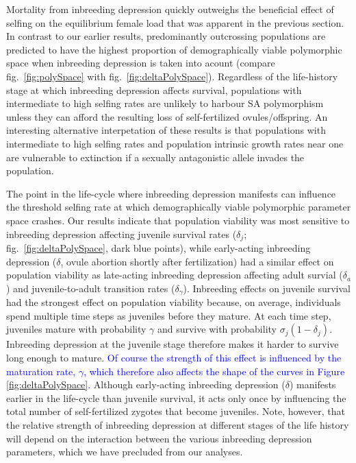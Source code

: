 \documentclass[11pt]{article}
\begin{document}
Mortality from inbreeding depression quickly outweighs the beneficial effect of selfing on the equilibrium female load that was apparent in the previous section. In contrast to our earlier results, predominantly outcrossing populations are predicted to have the highest proportion of demographically viable polymorphic space when inbreeding depression is taken into acount (compare fig.~\ref{fig:polySpace} with fig.~\ref{fig:deltaPolySpace}). Regardless of the life-history stage at which inbreeding depression affects survival, populations with intermediate to high selfing rates are unlikely to harbour SA polymorphism unless they can afford the resulting loss of self-fertilized ovules/offspring. An interesting alternative interpetation of these results is that populations with intermediate to high selfing rates and population intrinsic growth rates near one are vulnerable to extinction if a sexually antagonistic allele invades the population.

The point in the life-cycle where inbreeding depression manifests can influence the threshold selfing rate at which demographically viable polymorphic parameter space crashes. Our results indicate that population viability was most sensitive to inbreeding depression affecting juvenile survival rates ($\delta_j$; fig.~\ref{fig:deltaPolySpace}, dark blue points), while early-acting inbreeding depression ($\delta$, ovule abortion shortly after fertilization) had a similar effect on population viability as late-acting inbreeding depression affecting adult survial ($\delta_a$) and juvenile-to-adult transition rates ($\delta_{\gamma}$). Inbreeding effects on juvenile survival had the strongest effect on population viability because, on average, individuals spend multiple time steps as juveniles before they mature. At each time step, juveniles mature with probability $\gamma$ and survive with probability $\sigma_j(1-\delta_j)$. Inbreeding depression at the juvenile stage therefore makes it harder to survive long enough to mature. \textcolor{blue}{Of course the strength of this effect is influenced by the maturation rate, $\gamma$, which therefore also affects the shape of the curves in Figure \ref{fig:deltaPolySpace}.} Although early-acting inbreeding depression ($\delta$) manifests earlier in the life-cycle than juvenile survival, it acts only once by influencing the total number of self-fertilized zygotes that become juveniles. Note, however, that the relative strength of inbreeding depression at different stages of the life history will depend on the interaction between the various inbreeding depression parameters, which we have precluded from our analyses.
\end{document}
